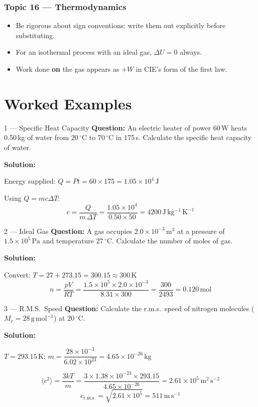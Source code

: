 \subsubsection{Topic 16 — Thermodynamics}
\begin{itemize}
  \item Be rigorous about sign conventions: write them out explicitly before
        substituting.
  \item For an isothermal process with an ideal gas, $\Delta U = 0$ always.
  \item Work done \textbf{on} the gas appears as $+W$ in CIE's form of the first law.
\end{itemize}

\section{Worked Examples}

\begin{examplebox}{1 — Specific Heat Capacity}
\textbf{Question:} An electric heater of power 60\,W heats 0.50\,kg of water from
$20\,{}^{\circ}$C to $70\,{}^{\circ}$C in 175\,s. Calculate the specific heat capacity
of water.

\medskip\textbf{Solution:}

Energy supplied: $Q = Pt = 60 \times 175 = 1.05\times10^4\,\mathrm{J}$

Using $Q = mc\Delta T$:
\[
  c = \frac{Q}{m\,\Delta T} = \frac{1.05\times10^4}{0.50 \times 50}
    = 4200\,\mathrm{J\,kg^{-1}\,K^{-1}}
\]
\end{examplebox}

\begin{examplebox}{2 — Ideal Gas}
\textbf{Question:} A gas occupies $2.0\times10^{-3}\,\mathrm{m}^3$ at a pressure of
$1.5\times10^5\,\mathrm{Pa}$ and temperature $27\,{}^{\circ}$C. Calculate the number
of moles of gas.

\medskip\textbf{Solution:}

Convert: $T = 27 + 273.15 = 300.15 \approx 300\,\mathrm{K}$
\[
  n = \frac{pV}{RT}
    = \frac{1.5\times10^5 \times 2.0\times10^{-3}}{8.31 \times 300}
    = \frac{300}{2493}
    = 0.120\,\mathrm{mol}
\]
\end{examplebox}

\begin{examplebox}{3 — R.M.S.\ Speed}
\textbf{Question:} Calculate the r.m.s.\ speed of nitrogen molecules
($M_r = 28\,\mathrm{g\,mol}^{-1}$) at $20\,{}^{\circ}$C.

\medskip\textbf{Solution:}

$T = 293.15\,\mathrm{K}$;\quad
$m = \dfrac{28\times10^{-3}}{6.02\times10^{23}} = 4.65\times10^{-26}\,\mathrm{kg}$

\[
  \langle c^2\rangle = \frac{3kT}{m}
    = \frac{3 \times 1.38\times10^{-23} \times 293.15}{4.65\times10^{-26}}
    = 2.61\times10^5\,\mathrm{m^2\,s^{-2}}
\]
\[
  c_{\mathrm{r.m.s.}} = \sqrt{2.61\times10^5} = 511\,\mathrm{m\,s^{-1}}
\]
\end{examplebox}

